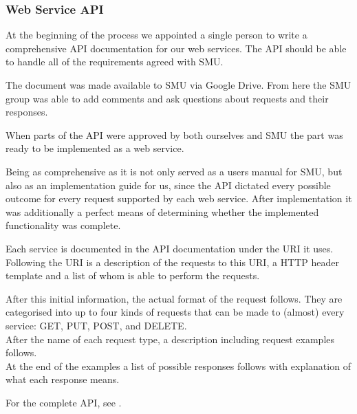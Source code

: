 \subsubsection{Web Service API}
At the beginning of the process we appointed a single person to write a comprehensive API documentation for our web services.
The API should be able to handle all of the requirements agreed with SMU.

The document was made available to SMU via Google Drive. From here the SMU group was able to add comments and ask questions about requests and their responses.

When parts of the API were approved by both ourselves and SMU the part was ready to be implemented as a web service.

Being as comprehensive as it is not only served as a users manual for SMU, but also as an implementation guide for us, since the API dictated every possible outcome for every request supported by each web service. After implementation it was additionally a perfect means of determining whether the implemented functionality was complete.

Each service is documented in the API documentation under the URI it uses. Following the URI is a description of the requests to this URI, a HTTP header template and a list of whom is able to perform the requests.

After this initial information, the actual format of the request follows. They are categorised into up to four kinds of requests that can be made to (almost) every service: GET, PUT, POST, and DELETE. \\
After the name of each request type, a description including request examples follows. \\
At the end of the examples a list of possible responses follows with explanation of what each response means.

For the complete API, see .
